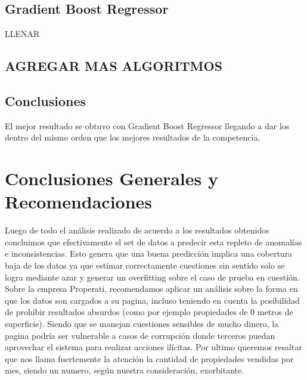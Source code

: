 \documentclass[a4paper, 10pt]{article}
\begin{document}
		\subsection{Gradient Boost Regressor}
			LLENAR
		
		\subsection{AGREGAR MAS ALGORITMOS}		
		
		\subsection{Conclusiones}
			El mejor resultado se obtuvo con Gradient Boost Regressor llegando a dar los dentro del mismo orden que los mejores resultados de la competencia.
			
		\section{Conclusiones Generales y Recomendaciones}
		
			Luego de todo el análisis realizado de acuerdo a los resultados obtenidos concluimos que efectivamente el set de datos a predecir esta repleto de anomalías e inconsistencias. Esto genera que una buena predicción implica una cobertura baja de los datos ya que estimar correctamente cuestiones sin sentido solo se logra mediante azar y generar un overfitting sobre el caso de prueba en cuestión.\\
			Sobre la empresa Properati, recomendamos aplicar un análisis sobre la forma en que los datos son cargados a su pagina, incluso teniendo en cuenta la posibilidad de prohibir resultados absurdos (como por ejemplo propiedades de 0 metros de superficie). Siendo que se manejan cuestiones sensibles de mucho dinero, la pagina podría ser vulnerable a casos de corrupción donde terceros puedan aprovechar el sistema para realizar acciones ilícitas. Por ultimo queremos resaltar que nos llama fuertemente la atención la cantidad de propiedades vendidas por mes, siendo un numero, según nuestra consideración, exorbitante.	
			
\end{document}
